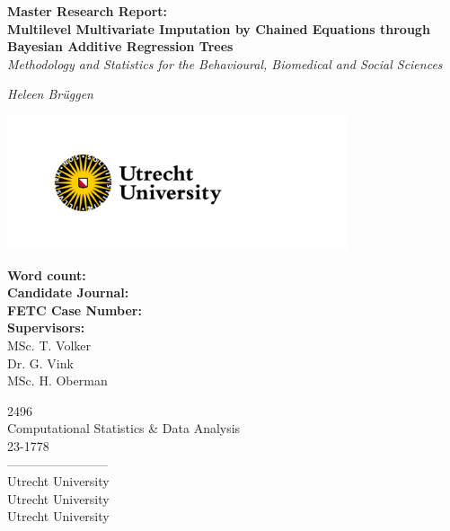 \documentclass[10pt, a4paper, titlepage]{article}
\begin{document}
\begin{titlingpage}
\begin{center}
\Huge\textbf{Master Research Report:  \\ Multilevel Multivariate Imputation by Chained Equations through Bayesian Additive Regression Trees} \\
\Large\textit{Methodology and Statistics for the Behavioural, Biomedical and Social Sciences}

\vspace{.5cm}

\normalsize\textit{Heleen Brüggen}

\vspace{11.5cm}

\begin{minipage}{.5\textwidth}
\begin{center}
        \includegraphics[width=10cm]{graphs/UU_logo_2021_EN_RGB.png}
\end{center}
\end{minipage}%

\vspace{.25cm}

\begin{minipage}{0.5\textwidth}
\begin{flushleft}

\textbf{Word count:} \\
\textbf{Candidate Journal:} \\
\textbf{FETC Case Number:} \\
\textbf{Supervisors:} \\
MSc. T. Volker \\
Dr. G. Vink \\
MSc. H. Oberman
\end{flushleft}
\end{minipage}%
\begin{minipage}{0.5\textwidth}
\begin{flushright}

2496 \\
Computational Statistics \& Data Analysis \\
23-1778 \\
------------------------\\
Utrecht University \\
Utrecht University \\
Utrecht University
\end{flushright}
\end{minipage}

\end{center}
\end{titlingpage}
\end{document}

